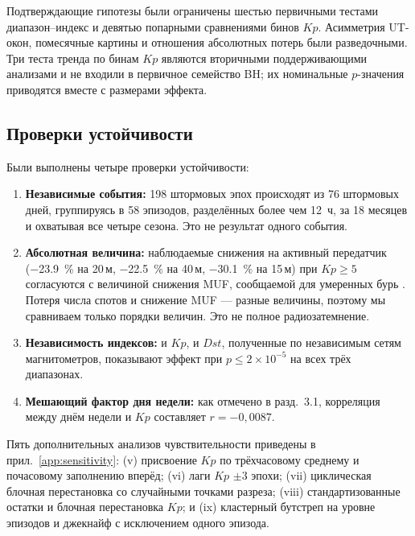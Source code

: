 \documentclass{agujournal2019}
\begin{document}
Подтверждающие гипотезы были ограничены шестью первичными тестами
диапазон--индекс и девятью попарными сравнениями бинов $Kp$. Асимметрия
UT-окон, помесячные картины и отношения абсолютных потерь были
разведочными. Три теста тренда по бинам $Kp$ являются
вторичными поддерживающими анализами и не входили в первичное семейство
BH; их номинальные $p$-значения приводятся вместе с размерами эффекта.

\subsection{Проверки устойчивости}

Были выполнены четыре проверки устойчивости:

\begin{enumerate}
	\item \textbf{Независимые события:} 198 штормовых эпох происходят
	      из 76 штормовых дней, группируясь в 58 эпизодов, разделённых
	      более чем 12~ч, за 18 месяцев и охватывая все четыре сезона.
	      Это не результат одного события.
	\item \textbf{Абсолютная величина:} наблюдаемые снижения на активный передатчик
	      (\SI{-23,9}{\percent} на 20\,м, \SI{-22,5}{\percent} на 40\,м,
	      \SI{-30,1}{\percent} на 15\,м) при $Kp \ge 5$
	      согласуются с величиной снижения MUF, сообщаемой для умеренных
	      бурь \citep{davies1990}. Потеря числа спотов и снижение MUF —
	      разные величины, поэтому мы сравниваем только порядки величин.
	      Это не полное радиозатемнение.
	\item \textbf{Независимость индексов:} и $Kp$, и $Dst$, полученные
	      по независимым сетям магнитометров, показывают эффект при
	      $p \le 2 \times 10^{-5}$ на всех трёх диапазонах.
	\item \textbf{Мешающий фактор дня недели:} как отмечено в разд.~3.1,
	      корреляция между днём недели и $Kp$ составляет
	      $r = -0{,}0087$.
\end{enumerate}

Пять дополнительных анализов чувствительности приведены в
прил.~\ref{app:sensitivity}: (v) присвоение $Kp$ по трёхчасовому
среднему и почасовому заполнению вперёд; (vi) лаги $Kp$ $\pm 3$ эпохи;
(vii) циклическая блочная перестановка со случайными точками разреза;
(viii) стандартизованные остатки и блочная перестановка $Kp$;
и (ix) кластерный бутстреп на уровне эпизодов и джекнайф с исключением
одного эпизода.


\end{document}
